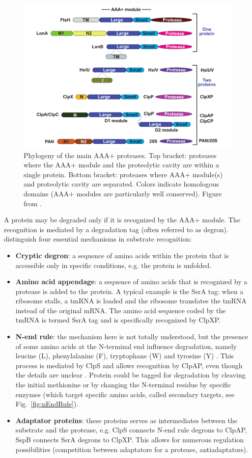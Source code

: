 \begin{figure}[!ht]
	\centering
	\includegraphics[width=0.8\linewidth]{figure/proteaseFamily}
	\caption{Phylogeny of the main AAA+ proteases. Top bracket: proteases where the AAA+ module and the proteolytic cavity are within a single protein. Bottom bracket: proteases where AAA+ module(s) and proteolytic cavity are separated. Colors indicate homologous domains (AAA+ modules are particularly well conserved). Figure from \citet{sauer_aaa+_2011}.}
	\label{fig:proteaseFamily}	
\end{figure}

A protein may be degraded only if it is recognized by the AAA+ module. The recognition is mediated by a degradation tag (often referred to as degron). \citet{sauer_aaa+_2011} distinguish four essential mechanisms in substrate recognition:
\begin{itemize}
	\item \textbf{Cryptic degron}: a sequence of amino acids within the protein that is accessible only in specific conditions, e.g. the protein is unfolded.
	\item \textbf{Amino acid appendage}: a sequence of amino acids that is recognized by a protease is added to the protein. A typical example is the SsrA tag: when a ribosome stalls, a tmRNA is loaded and the ribosome translates the tmRNA instead of the original mRNA. The amino acid sequence coded by the tmRNA is termed SsrA tag and is specifically recognized by ClpXP.
	\item \textbf{N-end rule}: the mechanism here is not totally understood, but the presence of some amino acids at the N-terminal end influence degradation, namely leucine (L), phenylalanine (F), tryptophane (W) and tyrosine (Y) \citep{sauer_aaa+_2011,tasaki_n-end_2012}. This process is mediated by ClpS and allows recognition by ClpAP, even though the details are unclear \citep{roman-hernandez_clps_2011,sauer_aaa+_2011,tasaki_n-end_2012}. Protein could be tagged for degradation by cleaving the initial methionine or by changing the N-terminal residue by specific enzymes (which target specific amino acids, called secondary targets, see Fig.~\ref{fig:nEndRule}).
	\item \textbf{Adaptator proteins}: these proteins serves as intermediates between the substrate and the protease, e.g. ClpS connects N-end rule degrons to ClpAP, SspB connects SsrA degrons to ClpXP. This allows for numerous regulation possibilities (competition between adaptators for a protease, antiadaptators).
\end{itemize}

